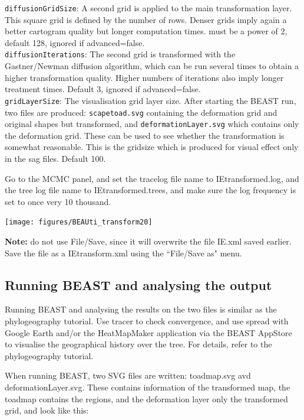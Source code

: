 \documentclass{article}
\begin{document}
{\tt diffusionGridSize}: A second grid is applied to the main transformation layer. 
This square grid is defined by the number of rows. 
Denser grids imply again a better cartogram quality but longer computation times.
must be a power of 2, default 128, ignored if advanced=false.\\

{\tt diffusionIterations}: The second grid is transformed with the Gastner/Newman diffusion 
algorithm, which can be run several times to obtain a higher transformation quality. 
Higher numbers of iterations also imply longer treatment times.
Default 3, ignored if advanced=false.\\

{\tt gridLayerSize}: The visualisation grid layer size. After starting the BEAST run, two files are produced:
{\tt scapetoad.svg} containing the deformation grid and original shapes but transformed, and 
{\tt deformationLayer.svg} which contains only the deformation grid. These can be used to see whether the transformation is somewhat reasonable. This is the gridsize which is produced for visual effect only in the sag files. 
Default 100.


Go to the MCMC panel, and set the tracelog file name to IEtransformed.log, and the tree log file name to IEtransformed.trees, and make sure the log frequency is set to once very 10 thousand.
\begin{center}
\texttt{[image: figures/BEAUti\_transform20]}
\end{center}

{\bf Note:} do not use File/Save, since it will overwrite the file IE.xml saved earlier. Save the file as a IEtransform.xml using the ``File/Save as" menu.

\subsection*{Running BEAST and analysing the output}

Running BEAST and analysing the results on the two files is similar as the phylogeography tutorial. Use tracer to check convergence, and use spread with Google Earth and/or the HeatMapMaker application via the BEAST AppStore to visualise the geographical history over the tree. For details, refer to the phylogeography tutorial.

When running BEAST, two SVG files are written: toadmap.svg avd deformationLayer.svg. These contains information of the transformed map, the toadmap contains the regions, and the deformation layer only the transformed grid, and look like this:
\end{document}
